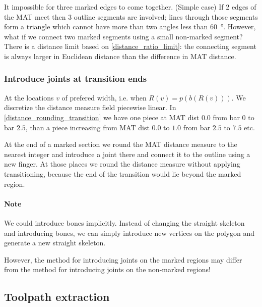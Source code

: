 It impossible for three marked edges to come together.
(Simple case) If 2 edges of the MAT meet then 3 outline segments are involved; lines through those segments form a triangle which cannot have more than two angles less than \SI{60}{\degree}.
However, what if we connect two marked segments using a small non-marked segment?
There is a distance limit based on \cref{distance_ratio_limit}:
the connecting segment is always larger in Euclidean distance than the difference in MAT distance.




\subsubsection{Introduce joints at transition ends}
At the locations $v$ of prefered width, i.e. when $R(v) = p(b(R(v)))$.
We discretize the distance measure field piecewise linear.
In \cref{distance_rounding_transition} we have one piece at MAT dist $0.0$ from bar $0$ to bar $2.5$, than a piece increasing from MAT dist $0.0$ to $1.0$ from bar $2.5$ to $7.5$ etc.

At the end of a marked section we round the MAT distance measure to the nearest integer and introduce a joint there and connect it to the outline using a new finger.
At those places we round the distance measure without applying transitioning, because the end of the transition would lie beyond the marked region.
 
\paragraph{Note}
We could introduce bones implicitly.
Instead of changing the straight skeleton and introducing bones,
we can simply introduce new vertices on the polygon and generate a new straight skeleton.

However, the method for introducing joints on the marked regions may differ from the method for introducing joints on the non-marked regions!




\subsection{Toolpath extraction}

